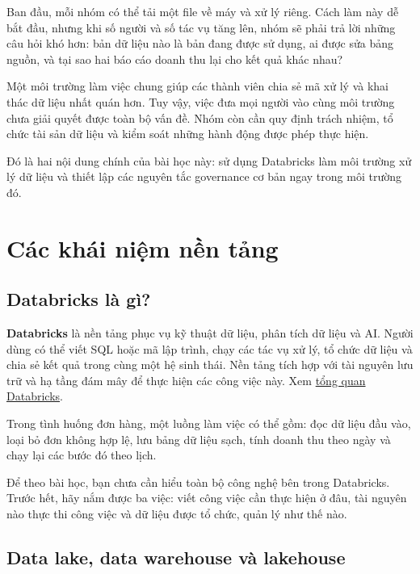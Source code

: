 Ban đầu, mỗi nhóm có thể tải một file về máy và xử lý riêng. Cách làm này dễ bắt đầu, nhưng khi số người và số tác vụ tăng lên, nhóm sẽ phải trả lời những câu hỏi khó hơn: bản dữ liệu nào là bản đang được sử dụng, ai được sửa bảng nguồn, và tại sao hai báo cáo doanh thu lại cho kết quả khác nhau?


Một môi trường làm việc chung giúp các thành viên chia sẻ mã xử lý và khai thác dữ liệu nhất quán hơn. Tuy vậy, việc đưa mọi người vào cùng môi trường chưa giải quyết được toàn bộ vấn đề. Nhóm còn cần quy định trách nhiệm, tổ chức tài sản dữ liệu và kiểm soát những hành động được phép thực hiện.


Đó là hai nội dung chính của bài học này: sử dụng Databricks làm môi trường xử lý dữ liệu và thiết lập các nguyên tắc governance cơ bản ngay trong môi trường đó.


\FloatBarrier
{}
\section{Các khái niệm nền tảng}

\FloatBarrier
{}
\subsection{Databricks là gì?}

\textbf{Databricks} là nền tảng phục vụ kỹ thuật dữ liệu, phân tích dữ liệu và AI. Người dùng có thể viết SQL hoặc mã lập trình, chạy các tác vụ xử lý, tổ chức dữ liệu và chia sẻ kết quả trong cùng một hệ sinh thái. Nền tảng tích hợp với tài nguyên lưu trữ và hạ tầng đám mây để thực hiện các công việc này. Xem \href{https://docs.databricks.com/aws/en/introduction/}{tổng quan Databricks}.


Trong tình huống đơn hàng, một luồng làm việc có thể gồm: đọc dữ liệu đầu vào, loại bỏ đơn không hợp lệ, lưu bảng dữ liệu sạch, tính doanh thu theo ngày và chạy lại các bước đó theo lịch.


Để theo bài học, bạn chưa cần hiểu toàn bộ công nghệ bên trong Databricks. Trước hết, hãy nắm được ba việc: viết công việc cần thực hiện ở đâu, tài nguyên nào thực thi công việc và dữ liệu được tổ chức, quản lý như thế nào.


\FloatBarrier
{}
\subsection{Data lake, data warehouse và lakehouse}

